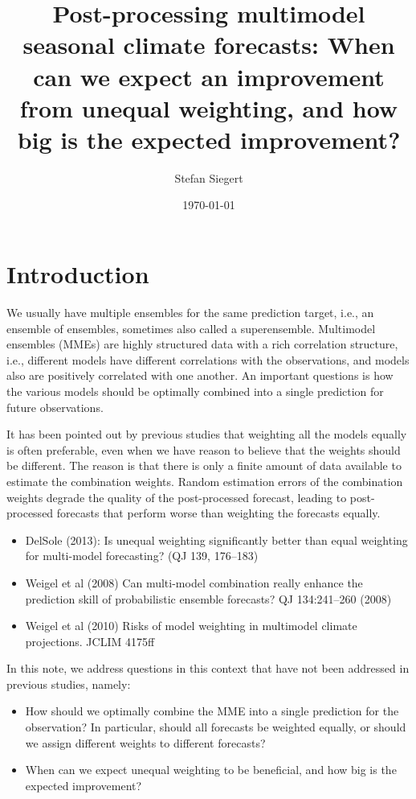 \documentclass[12pt]{article}
\author{Stefan Siegert}
\title{Post-processing multimodel seasonal climate forecasts: When can we expect an improvement from unequal weighting, and how big is the expected improvement?}
\date{\today}
\begin{document}
\maketitle
\thispagestyle{empty}


\section{Introduction}

We usually have multiple ensembles for the same prediction target, i.e., an ensemble of ensembles, sometimes also called a superensemble.
Multimodel ensembles (MMEs) are highly structured data with a rich correlation structure, i.e., different models have different correlations with the observations, and models also are positively correlated with one another.
An important questions is how the various models should be optimally combined into a single prediction for future observations.


It has been pointed out by previous studies that weighting all the models equally is often preferable, even when we have reason to believe that the weights should be different.
The reason is that there is only a finite amount of data available to estimate the combination weights.
Random estimation errors of the combination weights degrade the quality of the post-processed forecast, leading to post-processed forecasts that perform worse than weighting the forecasts equally.

\begin{itemize}
\item DelSole (2013): Is unequal weighting significantly better than equal weighting for multi-model forecasting? (QJ 139, 176--183)
\item Weigel et al (2008) Can multi-model combination really enhance the prediction skill of probabilistic ensemble forecasts? QJ 134:241--260 (2008)
\item Weigel et al (2010) Risks of model weighting in multimodel climate projections. JCLIM 4175ff
\end{itemize}


In this note, we address questions in this context that have not been addressed in previous studies, namely:
%
\begin{itemize}
\item How should we optimally combine the MME into a single prediction for the observation? In particular, should all forecasts be weighted equally, or should we assign different weights to different forecasts? 
\item When can we expect unequal weighting to be beneficial, and how big is the expected improvement?
\end{itemize}
\end{document}
